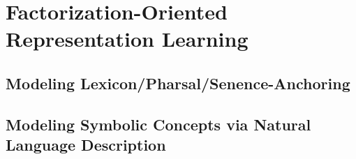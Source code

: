 \section{Factorization-Oriented Representation Learning}

\subsection{Modeling Lexicon/Pharsal/Senence-Anchoring}
\subsection{Modeling Symbolic Concepts via Natural Language Description}

